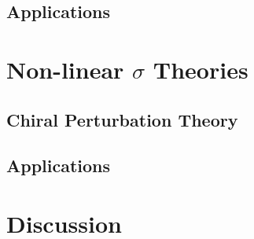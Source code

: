 \documentclass[aps,prd,onecolumn,showpacs,amsmath,amssymb,nofootinbib]{revtex4} \pdfoutput=1
\begin{document}
\subsection{Applications}
\section{Non-linear $\sigma$ Theories}\label{V}
\subsection{Chiral Perturbation Theory}
\subsection{Applications}

\section{Discussion}\label{VI}

\clearpage
%

\end{document}
